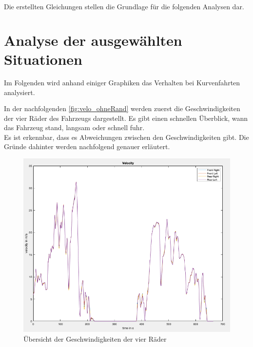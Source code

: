 Die erstellten Gleichungen stellen die Grundlage für die folgenden Analysen dar.
\newpage
\section{Analyse der ausgewählten Situationen}
	Im Folgenden wird anhand einiger Graphiken das Verhalten bei Kurvenfahrten analysiert.
	
	In der nachfolgenden \autoref{fig:velo_ohneRand} werden zuerst die Geschwindigkeiten der vier Räder des Fahrzeugs dargestellt. Es gibt einen schnellen Überblick, wann das Fahrzeug stand, langsam oder schnell fuhr. \\
	Es ist erkennbar, dass es Abweichungen zwischen den Geschwindigkeiten gibt. Die Gründe dahinter werden nachfolgend genauer erläutert.
	\begin{figure}[h!]
		\centering
		\includegraphics[width=1\linewidth]{../Graphiken/velo_ohneRand}
		\caption{Übersicht der Geschwindigkeiten der vier Räder}
		\label{fig:velo_ohneRand}
	\end{figure}
\pagebreak





